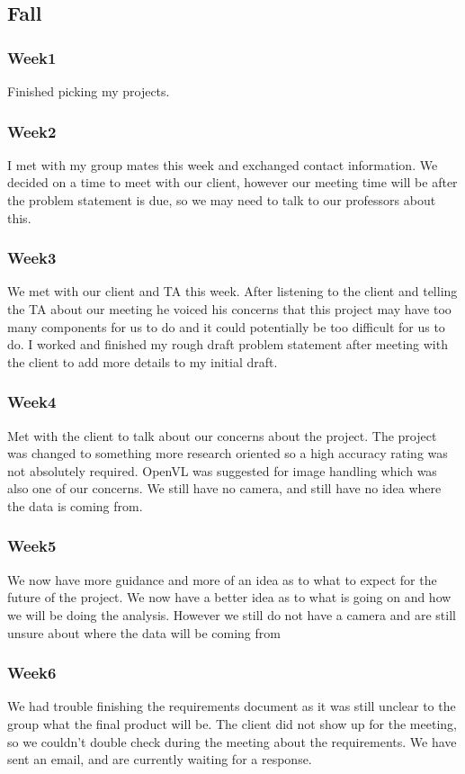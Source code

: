 \subsection*{Fall}
	\subsubsection*{Week1}
		Finished picking my projects.
	\subsubsection*{Week2}
		 I met with my group mates this week and exchanged contact information. We decided on a time to meet with our client, however our meeting time will be after the problem statement is due, so we may need to talk to our professors about this.
	\subsubsection*{Week3}
		We met with our client and TA this week. After listening to the client and telling the TA about our meeting he voiced his concerns that this project may have too many components for us to do and it could potentially be too difficult for us to do. I worked and finished my rough draft problem statement after meeting with the client to add more details to my initial draft.
	\subsubsection*{Week4}
		Met with the client to talk about our concerns about the project. The project was changed to something more research oriented so a high accuracy rating was not absolutely required. OpenVL was suggested for image handling which was also one of our concerns. We still have no camera, and still have no idea where the data is coming from.
	\subsubsection*{Week5}
		We now have more guidance and more of an idea as to what to expect for the future of the project. We now have a better idea as to what is going on and how we will be doing the analysis. However we still do not have a camera and are still unsure about where the data will be coming from
	\subsubsection*{Week6}
		We had trouble finishing the requirements document as it was still unclear to the group what the final product will be. The client did not show up for the meeting, so we couldn't double check during the meeting about the requirements. We have sent an email, and are currently waiting for a response.
